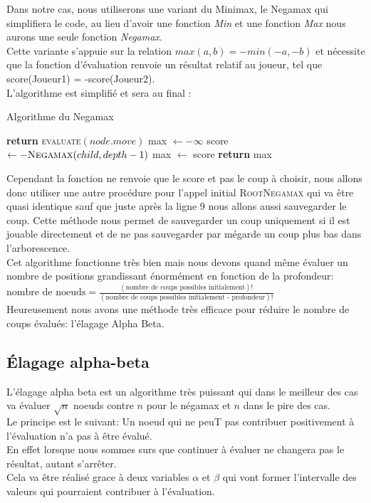 \documentclass{article}
\begin{document}
Dans notre cas, nous utiliserons une variant du Minimax, le Negamax qui simplifiera le code, au lieu d'avoir une fonction \textit{Min}
et une fonction \textit{Max} nous aurons une seule fonction \textit{Negamax}.\\
Cette variante s'appuie sur la relation $max(a,b) = -min(-a,-b)$ et nécessite que la fonction d'évaluation renvoie un résultat
relatif au joueur, tel que score(Joueur1) = -score(Joueur2).\\
L'algorithme est simplifié et sera au final :
\begin{algorithm}
\caption{Algorithme du Negamax}\label{negamax}
\begin{algorithmic}[1]
		\State \textbf{return} \textsc{evaluate}$(node.move)$
	\EndIf
	\State max $\gets -\infty$
		\State score $\gets -\textsc{Negamax}(child, depth -1)$
			\State max $\gets$ score
		\EndIf
	\EndFor
	\State \textbf{return} max
\EndProcedure
\end{algorithmic}
\end{algorithm}

Cependant la fonction ne renvoie que le score et pas le coup à choisir, nous allons donc utiliser une autre procédure pour l'appel initial
\textsc{RootNegamax} qui va être quasi identique sauf que juste après la ligne 9 nous allons aussi sauvegarder le coup. Cette méthode nous permet
de sauvegarder un coup uniquement si il est jouable directement et de ne pas sauvegarder par mégarde un coup plus bas dans
l'arborescence.\\

Cet algorithme fonctionne très bien mais nous devons quand même évaluer un nombre de positions grandissant énormément en fonction
de la profondeur:\\
$\text{nombre de noeuds} = \frac{(\text{nombre de coups possibles initialement})!}{(\text{nombre de coups possibles initialement - profondeur})!}$\\
Heureusement nous avons une méthode très efficace pour réduire le nombre de coups évalués: l'élagage Alpha Beta.

\pagebreak
\subsection{Élagage alpha-beta}

L'élagage alpha beta est un algorithme très puissant qui dans le meilleur des cas va évaluer $\sqrt{n}$ noeuds contre $n$ pour le négamax et $n$ dans
le pire des cas.\\
Le principe est le suivant: Un noeud qui ne peuT pas contribuer positivement à l'évaluation n'a pas à être évalué.\\
En effet lorsque nous sommes surs que continuer à évaluer ne changera pas le résultat, autant s'arrêter.\\
Cela va être réalisé grace à deux variables $\alpha$ et $\beta$ qui vont former l'intervalle des valeurs qui pourraient contribuer à l'évaluation.
\end{document}
